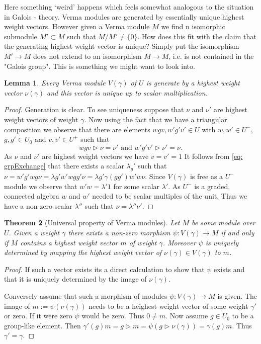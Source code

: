 \documentclass{amsart}
\newtheorem{theorem}{Theorem}[section]
\newtheorem{lemma}[theorem]{Lemma}
\theoremstyle{definition}
\begin{document}
Here something `weird' happens which feels somewhat analogous to the situation in Galois - theory. 
Verma modules are generated by essentially unique highest weight vectors.
However given a Verma module $M$ we find n isomorphic submodule $M' \subset M$ such that $M/M' \neq \{0\}$. 
How does this fit with the claim that the generating highest weight vector is unique?
Simply put the isomorphism
$M' \rightarrow M$ does not extend to an isomorphism $M \rightarrow M$, i.e. is not contained in the "Galois group". This is something we might want to look into.

\begin{lemma}
	Every Verma module $V(\gamma)$ of $U$  is generate by a highest weight vector $\nu(\gamma)$ and this vector is unique up to scalar multiplication.
\end{lemma}
\begin{proof}
	Generation is clear.
	To see uniqueness suppose that $\nu$ and $\nu'$ are highest weight vectors of weight $\gamma$.
	Now using the fact that we have a triangular composition we observe that there are elements $wgv, w'g'v' \in U$ with $w,w' \in U^-$, $g,g' \in U_0$ and $v,v' \in U^+$ such that
	$$
		wgv \triangleright \nu = \nu' \text{ and } w'g'v' \triangleright \nu' = \nu.
	$$
	As $\nu$ and $\nu'$ are highest weight vectors we have $v=v'=1$
	It follows from \eqref{eq: grpExchange} that there exists a scalar $\lambda_g'$ such that
	$\nu= w'g'wg \nu = \lambda{g'} w'w gg'\nu = \lambda{g'} \gamma(gg') w'w \nu $.
	Since $V(\gamma)$ is free as a $U^-$ module we observe that $w'w = \lambda'1$ for some scalar $\lambda'$.
	As $U^-$ is a graded, connected algebra $w$ and $w'$ needed to be scalar multiples of the unit.
	Thus we have a non-zero scalar $\lambda''$ such that 
	$\nu= \lambda'' \nu'$.
\end{proof}

\begin{theorem}[Universal property of Verma modules]
	Let $M$ be some module over $U$. Given a weight $\gamma$ there exists a non-zero morphism $\psi: V(\gamma) \rightarrow M$ if and only if $M$ contains a highest weight vector $m$ of weight $\gamma$.
	Moreover $\psi$ is uniquely determined by mapping the highest weight vector of $\nu(\gamma) \in V(\gamma)$ to $m$. 
\end{theorem}
\begin{proof}
	If such a vector exists its a direct calculation to show that $\psi$ exists and that it is uniquely determined by the image of $\nu(\gamma)$.
	
	Conversely assume that such a morphism of modules $\psi: V(\gamma)\rightarrow M$ is given.
	The image of $m := \psi(\nu(\gamma))$ needs to be a heighest weight vector of some weight $\gamma'$ or zero.
	If it were zero $\psi$ would be zero. Thus $0 \neq m$.
	Now assume $g\in U_0$ to be a group-like element. Then
	$\gamma'(g) m =  g \triangleright m = \psi( g \triangleright \nu(\gamma))  = \gamma(g) m$.
	Thus $\gamma' = \gamma$.
\end{proof}
\end{document}
